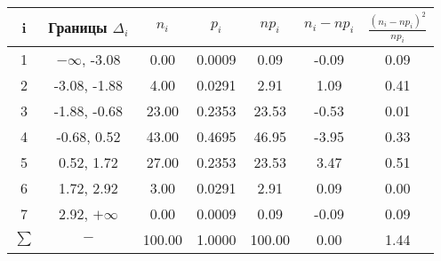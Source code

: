 \begin{tabular}{|c|c|c|c|c|c|c|}
\hline
\hline i & Границы $\Delta_i$ & $n_i$ & $p_i$ & $np_i$ & $n_i - np_i$ & $\frac{(n_i - np_i)^2}{np_i}$\\
\hline
1 & $-\infty$, -3.08 & 0.00 & 0.0009 & 0.09 & -0.09 & 0.09\\
\hline
2 & -3.08, -1.88 & 4.00 & 0.0291 & 2.91 & 1.09 & 0.41\\
\hline
3 & -1.88, -0.68 & 23.00 & 0.2353 & 23.53 & -0.53 & 0.01\\
\hline
4 & -0.68, 0.52 & 43.00 & 0.4695 & 46.95 & -3.95 & 0.33\\
\hline
5 & 0.52, 1.72 & 27.00 & 0.2353 & 23.53 & 3.47 & 0.51\\
\hline
6 & 1.72, 2.92 & 3.00 & 0.0291 & 2.91 & 0.09 & 0.00\\
\hline
7 & 2.92, $+\infty$ & 0.00 & 0.0009 & 0.09 & -0.09 & 0.09\\
\hline
$\sum$ & $-$ & 100.00 & 1.0000 & 100.00 & 0.00 & 1.44\\
\hline
\end{tabular}
